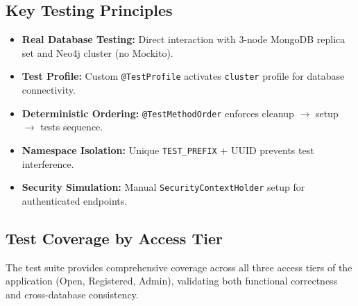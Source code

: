 \subsection{Key Testing Principles}
\begin{itemize}
    \item \textbf{Real Database Testing:} Direct interaction with 3-node MongoDB replica set and Neo4j cluster (no Mockito).
    \item \textbf{Test Profile:} Custom \texttt{@TestProfile} activates \texttt{cluster} profile for database connectivity.
    \item \textbf{Deterministic Ordering:} \texttt{@TestMethodOrder} enforces cleanup $\rightarrow$ setup $\rightarrow$ tests sequence.
    \item \textbf{Namespace Isolation:} Unique \texttt{TEST\_PREFIX} + UUID prevents test interference.
    \item \textbf{Security Simulation:} Manual \texttt{SecurityContextHolder} setup for authenticated endpoints.
\end{itemize}

\subsection{Test Coverage by Access Tier}
The test suite provides comprehensive coverage across all three access tiers of the application (Open, Registered, Admin), validating both functional correctness and cross-database consistency.

